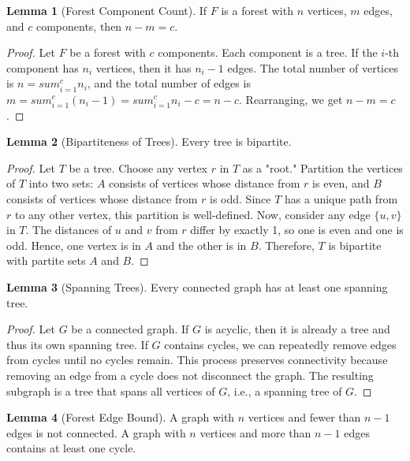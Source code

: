 \documentclass{article}
\theoremstyle{definition}
\def\sum{sum}%
\newtheorem{lemma}{Lemma}
\begin{document}
\begin{lemma}[Forest Component Count]
If $F$ is a forest with $n$ vertices, $m$ edges, and $c$ components, then $n - m = c$.
\end{lemma}

\begin{proof}
Let $F$ be a forest with $c$ components. Each component is a tree. If the $i$-th component has $n_i$ vertices, then it has $n_i - 1$ edges. The total number of vertices is $n = \sum_{i=1}^{c} n_i$, and the total number of edges is $m = \sum_{i=1}^{c} (n_i - 1) = \sum_{i=1}^{c} n_i - c = n - c$. Rearranging, we get $n - m = c$.
\end{proof}

\begin{lemma}[Bipartiteness of Trees]
Every tree is bipartite.
\end{lemma}

\begin{proof}
Let $T$ be a tree. Choose any vertex $r$ in $T$ as a "root." Partition the vertices of $T$ into two sets: $A$ consists of vertices whose distance from $r$ is even, and $B$ consists of vertices whose distance from $r$ is odd. Since $T$ has a unique path from $r$ to any other vertex, this partition is well-defined. Now, consider any edge $\{u, v\}$ in $T$. The distances of $u$ and $v$ from $r$ differ by exactly 1, so one is even and one is odd. Hence, one vertex is in $A$ and the other is in $B$. Therefore, $T$ is bipartite with partite sets $A$ and $B$.
\end{proof}

\begin{lemma}[Spanning Trees]
Every connected graph has at least one spanning tree.
\end{lemma}

\begin{proof}
Let $G$ be a connected graph. If $G$ is acyclic, then it is already a tree and thus its own spanning tree. If $G$ contains cycles, we can repeatedly remove edges from cycles until no cycles remain. This process preserves connectivity because removing an edge from a cycle does not disconnect the graph. The resulting subgraph is a tree that spans all vertices of $G$, i.e., a spanning tree of $G$.
\end{proof}

\begin{lemma}[Forest Edge Bound]
A graph with $n$ vertices and fewer than $n-1$ edges is not connected. A graph with $n$ vertices and more than $n-1$ edges contains at least one cycle.
\end{lemma}
\end{document}
